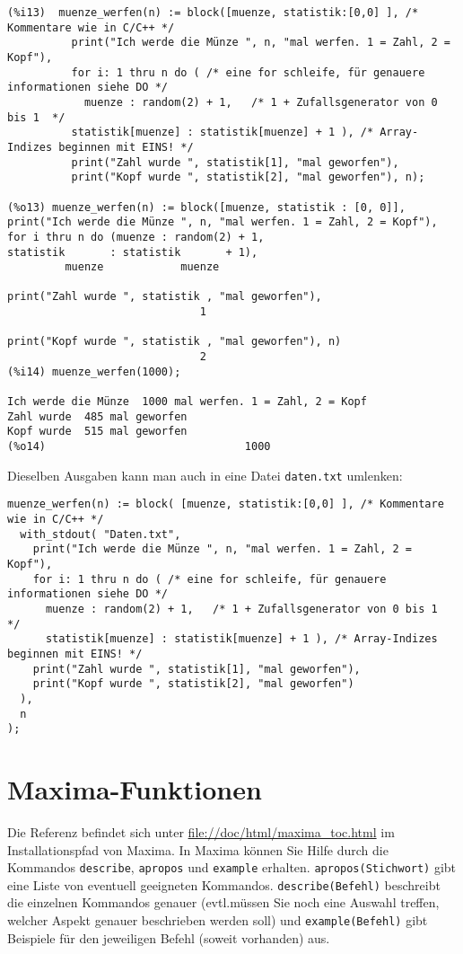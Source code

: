 \documentclass[12pt]{scrartcl}
\begin{document}
\begin{verbatim}
(%i13)  muenze_werfen(n) := block([muenze, statistik:[0,0] ], /* Kommentare wie in C/C++ */
          print("Ich werde die Münze ", n, "mal werfen. 1 = Zahl, 2 = Kopf"),
          for i: 1 thru n do ( /* eine for schleife, für genauere informationen siehe DO */
            muenze : random(2) + 1,   /* 1 + Zufallsgenerator von 0 bis 1  */
          statistik[muenze] : statistik[muenze] + 1 ), /* Array-Indizes beginnen mit EINS! */
          print("Zahl wurde ", statistik[1], "mal geworfen"),
          print("Kopf wurde ", statistik[2], "mal geworfen"), n);

(%o13) muenze_werfen(n) := block([muenze, statistik : [0, 0]],
print("Ich werde die Münze ", n, "mal werfen. 1 = Zahl, 2 = Kopf"),
for i thru n do (muenze : random(2) + 1,
statistik       : statistik       + 1),
         muenze            muenze

print("Zahl wurde ", statistik , "mal geworfen"),
                              1

print("Kopf wurde ", statistik , "mal geworfen"), n)
                              2
(%i14) muenze_werfen(1000);

Ich werde die Münze  1000 mal werfen. 1 = Zahl, 2 = Kopf
Zahl wurde  485 mal geworfen
Kopf wurde  515 mal geworfen
(%o14)                               1000
\end{verbatim}

Dieselben Ausgaben kann man auch in eine Datei \texttt{daten.txt} umlenken:

\begin{verbatim}
muenze_werfen(n) := block( [muenze, statistik:[0,0] ], /* Kommentare wie in C/C++ */
  with_stdout( "Daten.txt",
    print("Ich werde die Münze ", n, "mal werfen. 1 = Zahl, 2 = Kopf"),
    for i: 1 thru n do ( /* eine for schleife, für genauere informationen siehe DO */
      muenze : random(2) + 1,   /* 1 + Zufallsgenerator von 0 bis 1  */
      statistik[muenze] : statistik[muenze] + 1 ), /* Array-Indizes beginnen mit EINS! */
    print("Zahl wurde ", statistik[1], "mal geworfen"),
    print("Kopf wurde ", statistik[2], "mal geworfen")
  ),
  n
);
\end{verbatim}

\section{Maxima-Funktionen}

Die Referenz befindet sich unter \url{file://doc/html/maxima_toc.html} im
Installationspfad von Maxima. In Maxima können  Sie Hilfe durch die
Kommandos \texttt{describe}, \texttt{apropos} und  \texttt{example}
erhalten. \texttt{apropos(Stichwort)} gibt eine  Liste von eventuell
geeigneten Kommandos. \texttt{describe(Befehl)} beschreibt  die
einzelnen Kommandos genauer (evtl.\@ müssen Sie noch eine Auswahl treffen,
welcher Aspekt genauer beschrieben werden soll) und
\texttt{example(Befehl)} gibt Beispiele für den jeweiligen Befehl
(soweit vorhanden) aus.
\end{document}
